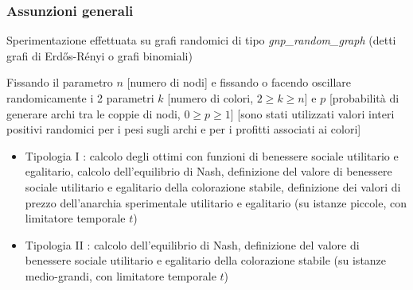\documentclass{beamer}
\begin{document}
\begin{frame}
\frametitle{Assunzioni generali}
Sperimentazione effettuata su \alert{grafi randomici} di tipo \textit{gnp\_random\_graph} (detti grafi di Erdős-Rényi o grafi binomiali)\medskip

Fissando il parametro \alert{$n$} [\alert{numero di nodi}] e fissando o facendo oscillare randomicamente i 2 parametri \alert{$k$} [\alert{numero di colori}, $2 \geq k \geq n$] e \alert{$p$} [\alert{probabilità di generare archi tra le coppie di nodi}, $0 \geq p \geq 1$] [sono stati utilizzati \alert{valori interi positivi randomici} per i \alert{pesi} sugli archi e per i \alert{profitti} associati ai colori]
\begin{itemize}
	\item \alert{Tipologia I} : calcolo degli ottimi con funzioni di benessere sociale utilitario e egalitario, calcolo dell'equilibrio di Nash, definizione del valore di benessere sociale utilitario e egalitario della colorazione stabile, definizione dei valori di prezzo dell'anarchia sperimentale utilitario e egalitario (su istanze piccole, con limitatore temporale $t$)
	\item \alert{Tipologia II} : calcolo dell'equilibrio di Nash, definizione del valore di benessere sociale utilitario e egalitario della colorazione stabile (su istanze medio-grandi, con limitatore temporale $t$)
\end{itemize}
\end{frame}
\end{document}
